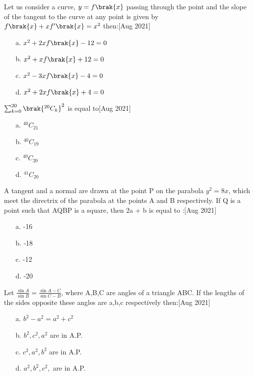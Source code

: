 \item Let us consider a curve, $y = f\brak{x}$ passing through the point  and the slope of the tangent to the curve at any point  is given by $f\brak{x}+xf'\brak{x}=x^2$ then:\hfill  [Aug 2021]
\begin{enumerate}
     \item [a.] $x^2+2xf\brak{x}-12=0$
    \item [b.] $x^2+xf\brak{x}+12=0$
    \item [c.] $x^2-3xf\brak{x}-4=0$
    \item [d.] $x^2+2xf\brak{x}+4=0$
\end{enumerate}
\item $\sum_{k=0}^{20} \brak{^{20}C_k}^2$ is equal to\hfill  [Aug 2021]
\begin{enumerate}
     \item [a.] $^{40}C_{21}$
    \item [b.] $^{40}C_{19}$
    \item [c.] $^{40}C_{20}$
    \item [d.] $^{41}C_{20}$
\end{enumerate}
\item A tangent and a normal are drawn at the point
P on the parabola $y^2 = 8x$, which meet the
directrix of the parabola at the points A and B
respectively. If Q is a point such that AQBP
is a square, then 2a + b is equal to :\hfill  [Aug 2021]
\begin{enumerate}
\item [a.] -16
    \item [b.]-18
    \item [c.] -12
    \item [d.] -20
\end{enumerate}
\item Let $\frac{\sin{A}}{\sin{B}}=\frac{\sin{A-C}}{\sin{C-B}}$, where A,B,C are angles of a triangle ABC. If the lengths of the sides opposite these angles are a,b,c respectively then:\hfill  [Aug 2021]
\begin{enumerate}
\item [a.] $b^2-a^2=a^2+c^2$
    \item [b.]$b^2,c^2,a^2$ are in A.P.
    \item [c.] $c^2,a^2,b^2$ are in A.P.
    \item [d.] $a^2,b^2,c^2,$ are in A.P.
\end{enumerate}

